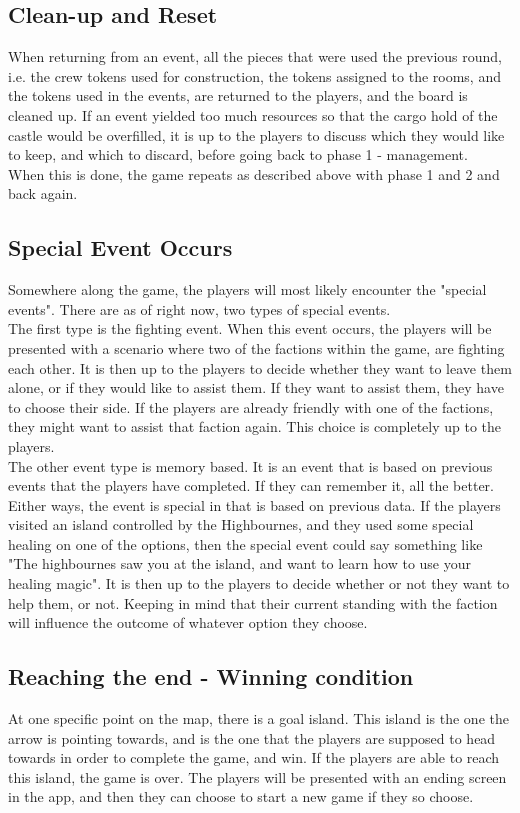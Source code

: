 \subsection{Clean-up and Reset}

When returning from an event, all the pieces that were used the previous round, i.e. the crew tokens used for construction, the tokens assigned to the rooms, and the tokens used in the events, are returned to the players, and the board is cleaned up.
If an event yielded too much resources so that the cargo hold of the castle would be overfilled, it is up to the players to discuss which they would like to keep, and which to discard, before going back to phase 1 - management.\\
When this is done, the game repeats as described above with phase 1 and 2 and back again.

\subsection{Special Event Occurs}

Somewhere along the game, the players will most likely encounter the "special events". There are as of right now, two types of special events.\\
The first type is the fighting event. When this event occurs, the players will be presented with a scenario where two of the factions within the game, are fighting each other. It is then up to the players to decide whether they want to leave them alone, or if they would like to assist them. If they want to assist them, they have to choose their side. If the players are already friendly with one of the factions, they might want to assist that faction again. This choice is completely up to the players.\\
The other event type is memory based. It is an event that is based on previous events that the players have completed. If they can remember it, all the better. Either ways, the event is special in that is based on previous data. If the players visited an island controlled by the Highbournes, and they used some special healing on one of the options, then the special event could say something like "The highbournes saw you at the island, and want to learn how to use your healing magic". It is then up to the players to decide whether or not they want to help them, or not. Keeping in mind that their current standing with the faction will influence the outcome of whatever option they choose. 

\subsection{Reaching the end - Winning condition}
At one specific point on the map, there is a goal island. This island is the one the arrow is pointing towards, and is the one that the players are supposed to head towards in order to complete the game, and win.
If the players are able to reach this island, the game is over. The players will be presented with an ending screen in the app, and then they can choose to start a new game if they so choose. 

